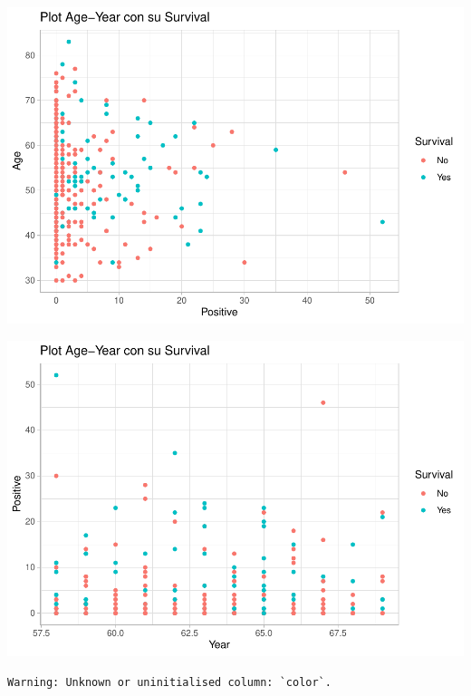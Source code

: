 \documentclass[
]{article}
\begin{document}
\begin{center}\includegraphics{Clasificacion_files/figure-latex/unnamed-chunk-7-2} \end{center}

\begin{center}\includegraphics{Clasificacion_files/figure-latex/unnamed-chunk-7-3} \end{center}

\begin{verbatim}
Warning: Unknown or uninitialised column: `color`.
\end{verbatim}
\end{document}
